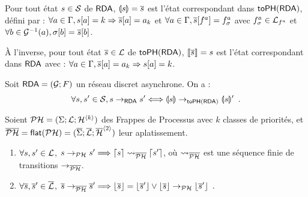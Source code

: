 \begin{definition}
  Pour tout état $s \in \mathcal{S}$ de $\mathsf{RDA}$,
  $\llparenthesis s\rrparenthesis = \overline{s}$ est l'état correspondant dans $\mathsf{toPH}(\mathsf{RDA})$, défini par :
  $\forall a \in \mathrm{\Gamma}, s[{a}] = k \Rightarrow \overline{s}[{a}] = a_k$
  et
  $\forall a \in \mathrm{\Gamma}, \overline{s}[{f^a}]=f^a_\sigma$
  avec $f^a_\sigma \in \mathcal{L}_{f^a}$
  et $\forall b \in \mathcal{G}^{-1}(a), \sigma[{b}] = \overline{s}[{b}]$.

  À l'inverse, pour tout état $\overline{s} \in \mathcal{L}$ de $\mathsf{toPH}(\mathsf{RDA})$,
  $\llbracket\overline{s}\rrbracket = s$ est l'état correspondant dans $\mathsf{RDA}$ avec :
  $\forall a \in \mathrm{\Gamma}, \overline{s}[{a}] = a_k \Rightarrow s[{a}] = k$.
\end{definition}

\begin{theorem}[$\RDA \approx \rdatoph$]
  Soit $\mathsf{RDA} = (\mathcal{G}; F)$ un réseau discret asynchrone.
  On a :
  \[\forall s, s' \in \mathcal{S}, s \rightarrow_{\mathsf{RDA}} s' \Longleftrightarrow
    \llparenthesis s\rrparenthesis \rightarrow_{\mathsf{toPH}(\mathsf{RDA})} \llparenthesis s\rrparenthesis' \enspace.\]
\end{theorem}


\begin{theorem}[$\PH \approx \PHflat(\PH)$]
  Soient $\mathcal{PH} = (\Sigma; \mathcal{L}; \mathcal{H}^{{\langle k \rangle}})$ des Frappes de Processus avec $k$
  classes de priorités,
  et $\overline{\mathcal{PH}} = \mathsf{flat}(\mathcal{PH}) = (\overline{\Sigma}; \overline{\mathcal{L}}; \overline{\mathcal{H}}^{{\langle 2 \rangle}})$ leur aplatissement.
  \begin{enumerate}
    \item \label{php2ph} $\forall s, s' \in \mathcal{L}$,
      $s \rightarrow_{\mathcal{PH}} s' \Longrightarrow \lceil s \rceil \rightsquigarrow_{\overline{\mathcal{PH}}} \lceil s' \rceil$,
      où $\rightsquigarrow_{\overline{\mathcal{PH}}}$ est une séquence finie de transitions $\rightarrow_{\overline{\mathcal{PH}}}$.
    \item \label{ph2php} $\forall \overline{s}, \overline{s}' \in \overline{\mathcal{L}}$,
      $\overline{s} \rightarrow_{\overline{\mathcal{PH}}} \overline{s}' \Longrightarrow \lfloor \overline{s} \rfloor = \lfloor \overline{s}' \rfloor \vee
      \lfloor \overline{s} \rfloor \rightarrow_{\mathcal{PH}} \lfloor \overline{s}' \rfloor \enspace.$
  \end{enumerate}
\end{theorem}


\TODO


